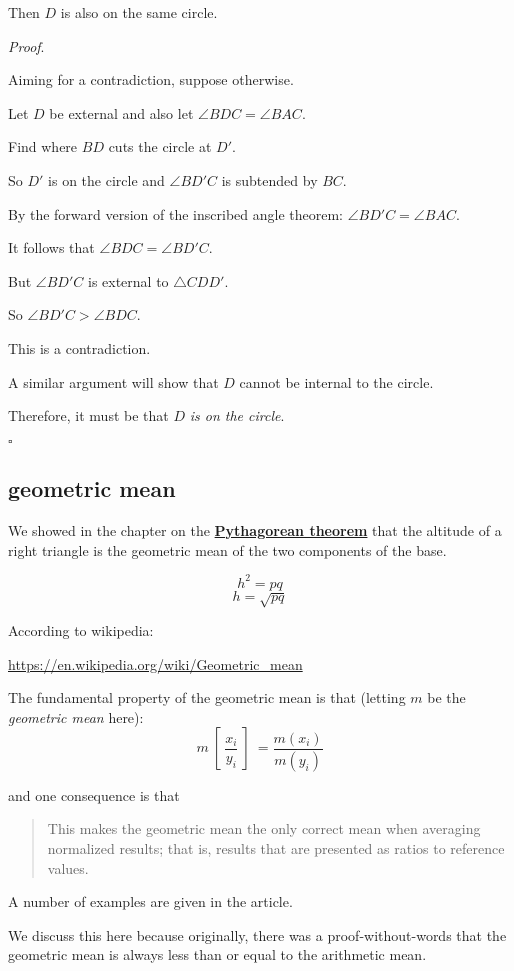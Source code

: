 \documentclass[11pt, oneside]{article}
\begin{document}
Then $D$ is also on the same circle.

\emph{Proof}.

Aiming for a contradiction, suppose otherwise.

Let $D$ be external and also let $\angle BDC = \angle BAC$.

Find where $BD$ cuts the circle at $D'$.

So $D'$ is on the circle and $\angle BD'C$ is subtended by $BC$.

By the forward version of the inscribed angle theorem:  
$\angle BD'C = \angle BAC$.

It follows that $\angle BDC = \angle BD'C$.

But $\angle BD'C$ is external to $\triangle CDD'$.

So $\angle BD'C > \angle BDC$.

This is a contradiction.

A similar argument will show that $D$ cannot be internal to the circle.

Therefore, it must be that $D$ \emph{is on the circle}.

$\square$


\subsection*{geometric mean}

We showed in the chapter on the \hyperref[sec:pythagorean_thm]{\textbf{Pythagorean theorem}} that the altitude of a right triangle is the geometric mean of the two components of the base.

\[ h^2 = pq \]
\[ h = \sqrt{pq} \]

According to wikipedia:

\url{https://en.wikipedia.org/wiki/Geometric_mean}

The fundamental property of the geometric mean is that (letting $m$ be the \emph{geometric mean} here):
\[ m \ [ \ \frac{x_i}{y_i} \ ] \ = \frac{m(x_i)}{m(y_i)} \]

and one consequence is that

\begin{quote}This makes the geometric mean the only correct mean when averaging normalized results; that is, results that are presented as ratios to reference values.\end{quote}

A number of examples are given in the article.

We discuss this here because originally, there was a proof-without-words that the geometric mean is always less than or equal to the arithmetic mean.
\end{document}

